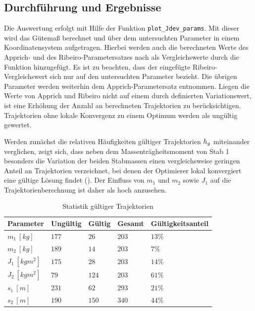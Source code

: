 \subsection{Durchführung und Ergebnisse}\label{subsec:trjParTestRes}

Die Auswertung erfolgt mit Hilfe der Funktion \texttt{plot\_Jdev\_params}. Mit dieser wird das Gütemaß berechnet und über dem untersuchten Parameter in einem Koordinatensystem aufgetragen. Hierbei werden auch die berechneten Werte des Apprich- und des Ribeiro-Parametersatzes nach  als Vergleichswerte durch die Funktion hinzugefügt. Es ist zu beachten, dass der eingefügte Ribeiro-Vergleichswert sich nur auf den untersuchten Parameter bezieht. Die übrigen Parameter werden weiterhin dem Apprich-Parametersatz entnommen. Liegen die Werte von Apprich und Ribeiro nicht auf einem durch  definierten Variationswert, ist eine Erhöhung der Anzahl an berechneten Trajektorien zu berücksichtigen. Trajektorien ohne lokale Konvergenz zu einem Optimum werden als ungültig gewertet.

Werden zunächst die relativen Häufigkeiten gültiger Trajektorien $h_g$ miteinander verglichen, zeigt sich, dass neben dem Massenträgheitsmoment von Stab 1 besonders die Variation der beiden Stabmassen einen vergleichsweise geringen Anteil an Trajektorien verzeichnet, bei denen der Optimierer lokal konvergiert \bzw eine gültige Lösung findet (). Der Einfluss von $m_1$ und $m_2$ sowie $J_1$ auf die Trajektorienberechnung ist daher als hoch anzusehen. 

\begin{table}[h]
	\centering
	\caption{Statistik gültiger Trajektorien}
		\begin{tabular}{lllll}
			\toprule
			Parameter  & Ungültig & Gültig & Gesamt & Gültigkeitsanteil \hg \\
			\midrule
			$m_1 \ [\unit{kg}]$     & $177$ & $26$    & $203$   & $13 \% $ \\
			$m_2 \ [\unit{kg}]$     & $189$ & $14$    & $203$   & $7 \% $ \\
			$J_1 \ [\unit{kg m^2}]$  & $175$ & $28$    & $203$   & $14 \%$ \\
			$J_2 \ [\unit{kg m^2}]$  & $79$  & $124$   & $203$   & $61 \%$ \\
			$s_1 \ [\unit{m}]$      &  $231$  & $62$ & $293$  &  $21 \%$\\
			$s_2 \ [\unit{m}]$      & $190$ & $150$   & $340$  & $44 \%$ \\
			\bottomrule
		\end{tabular}
	\label{tab:statTrj}
\end{table}

